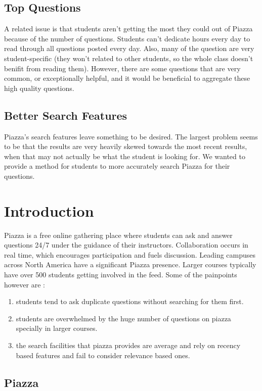 \documentclass[sigconf]{acmart}
\begin{document}
\subsection{Top Questions}
A related issue is that students aren't getting the most they could out of Piazza because of the number of questions. Students can't dedicate hours every day to read through all questions posted every day. Also, many of the question are very student-specific (they won't related to other students, so the whole class doesn't benifit from reading them). However, there are some questions that are very common, or exceptionally helpful, and it would be beneficial to aggregate these high quality questions.

\subsection{Better Search Features}
Piazza's search features leave something to be desired. The largest problem seems to be that the results are very heavily skewed towards the most recent results, when that may not actually be what the student is looking for. We wanted to provide a method for students to more accurately search Piazza for their questions.

\section{Introduction}

Piazza is a free online gathering place where students can ask and answer questions 24/7 under the guidance of their instructors. Collaboration occurs in real time, which encourages participation and fuels discussion. Leading campuses across North America have a significant Piazza presence. Larger courses typically have over 500 students getting involved in the feed. Some of the painpoints however are :
\begin{enumerate}
\item students tend to ask duplicate questions without searching for them first.
\item students are overwhelmed by the huge number of questions on piazza specially in larger courses.
\item the search facilities that piazza provides are average and rely on recency based features and fail to consider relevance based ones.
\end{enumerate}

\subsection{Piazza}
\end{document}
